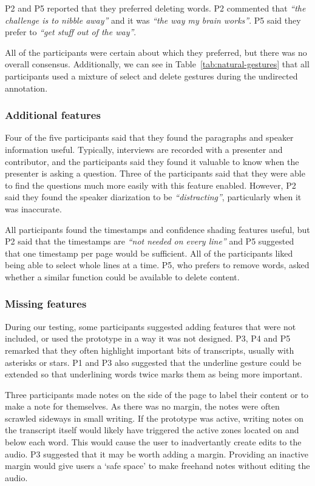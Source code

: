P2 and P5 reported that they preferred deleting words. P2 commented that \textit{``the challenge is to nibble away''}
and it was \textit{``the way my brain works''}. P5 said they prefer to \textit{``get stuff out of the way''}.

All of the participants were certain about which they preferred, but there was no overall consensus. Additionally, we
can see in Table~\ref{tab:natural-gestures} that all participants used a mixture of select and delete gestures during
the undirected annotation.

\subsubsection{Additional features}

Four of the five participants said that they found the paragraphs and speaker information useful. Typically, interviews
are recorded with a presenter and contributor, and the participants said they found it valuable to know when the
presenter is asking a question. Three of the participants said that they were able to find the questions much more
easily with this feature enabled. However, P2 said they found the speaker diarization to be \textit{``distracting''},
particularly when it was inaccurate.

All participants found the timestamps and confidence shading features useful, but P2 said that the timestamps are
\textit{``not needed on every line''} and P5 suggested that one timestamp per page would be sufficient. All of the
participants liked being able to select whole lines at a time. P5, who prefers to remove words, asked whether a similar
function could be available to delete content.

\subsubsection{Missing features}

During our testing, some participants suggested adding features that were not included, or used the prototype in a
way it was not designed.
P3, P4 and P5 remarked that they often highlight important bits of transcripts, usually with asterisks or stars.
P1 and P3 also suggested that the underline gesture could be extended so that underlining words twice marks them as
being more important.

Three participants made notes on the side of the page to label their content or to make a note for themselves. As there
was no margin, the notes were often scrawled sideways in small writing. If the prototype was active, writing notes
on the transcript itself would likely have triggered the active zones located on and below each word. This would cause
the user to inadvertantly create edits to the audio. P3 suggested that it may be worth adding a margin. Providing an
inactive margin would give users a `safe space' to make freehand notes without editing the audio.

